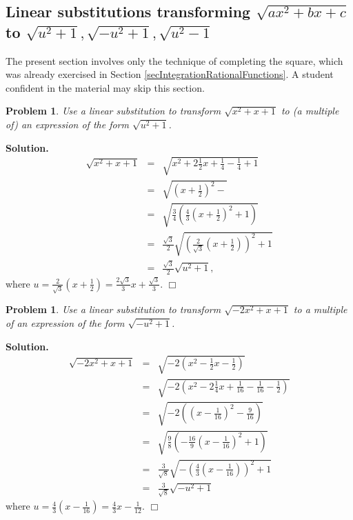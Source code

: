 \documentclass[12pt]{book}
\newenvironment{solution}{\medskip\noindent\textbf{Solution.} }{$\Box$}
\newtheorem{problem}[theorem]{Problem}
\begin{document}
\subsection{Linear substitutions transforming $\displaystyle \sqrt{ax^2+bx+c}$ to $\displaystyle \sqrt{u^2+1}, \sqrt{-u^2 +1}, \sqrt{u^2-1} $} \label{secEulerIntegralsAndLinearSubstitutions}
The present section involves only the technique of completing the square, which was already exercised in Section \ref{secIntegrationRationalFunctions}. A student confident in the material may skip this section.
\begin{problem}
Use a linear substitution to transform $\sqrt{x^2+x+1}$ to (a multiple of) an expression of the form $\sqrt{u^2+1}$.
\end{problem}
\begin{solution}
\[
\begin{array}{rcl}
\displaystyle \sqrt{x^2+x+1}&=&\displaystyle \sqrt{ x^2+2\frac{1}{2}x +\frac{1}{4}-\frac{1}{4} +1} \\
&=&\displaystyle  \sqrt{ \left(x+\frac{1}{2} \right)^2- }\\
&=&\displaystyle \sqrt{\frac{3}{4}\left( \frac{4}{3} \left(x+\frac{1}{2}\right)^2+1 \right)}\\
&=&\displaystyle \frac{\sqrt{3}}{2} \sqrt{\left( \frac{2}{ \sqrt{3}} \left( x+\frac{1}{2}\right)\right)^2+1}\\
&=&\displaystyle \frac{\sqrt{3}}{2} \sqrt{u^2+1},
\end{array}
\]
where $u=\frac{2}{\sqrt{3}}\left( x+\frac{1}{2}\right) = \frac{2 \sqrt{3}}{3}x+\frac{\sqrt{3}}{3}$.
\end{solution}

\begin{problem}
Use a linear substitution to transform $\sqrt{-2x^2+x+1}$ to a multiple of an expression of the form $\sqrt{-u^2+1}$.
\end{problem}
\begin{solution}
\[
\begin{array}{rcl}
\displaystyle \sqrt{-2x^2+x+1}&=&\displaystyle \sqrt{ -2\left( x^2-\frac{1}{2}x -\frac{1}{2}\right) } \\
&=&\displaystyle \sqrt{ -2\left(x^2-2\frac{1}{4}x +\frac{1}{16}-\frac{1}{16}-\frac{1}{2}\right) }\\
&=&\displaystyle \sqrt{-2\left( \left(x- \frac{1}{16} \right)^2 -\frac{9}{16} \right)}\\
&=&\displaystyle  \sqrt{\frac{9}{8}\left(- \frac{16}{9} \left( x-\frac{1}{16}\right)^2+1 \right)}\\
&=&\displaystyle  \frac{3}{\sqrt{8}} \sqrt{-\left( \frac{4}{3} \left(x-\frac{1}{16}\right)\right)^2+1 }\\
&=&\displaystyle \frac{ 3}{\sqrt{8}} \sqrt{-u^2+1}
\end{array}
\]
where $u=\frac{4}{3}\left(x-\frac{1}{16}\right) = \frac{4}{3}x - \frac{1}{12}$.
\end{solution}
\end{document}
